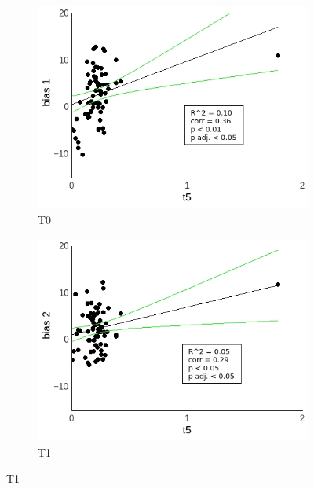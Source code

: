 \documentclass[a4paper]{scrreprt}
\begin{document}
\begin{figure}
\centering
\begin{subfigure}[b]{0.49\textwidth}
        \includegraphics[width=\textwidth]{figs/sec3/t5/t5_diff_1_mod2mod2.jpeg}
        \caption{T0}
    \end{subfigure}
    \begin{subfigure}[b]{0.49\textwidth}
        \includegraphics[width=\textwidth]{figs/sec3/t5/t5_diff_2_mod2mod2.jpeg}
        \caption{T1}
    \end{subfigure}


\end{figure}
\end{document}
